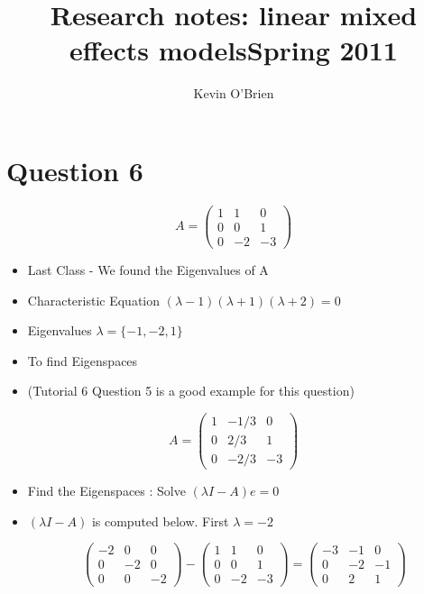 \documentclass[12pt, a4paper]{report}
\title{Research notes: linear mixed effects models}
\author{ } \date{ }
\theoremstyle{plain}
\theoremstyle{definition}
\theoremstyle{remark}
\begin{document}
\author{Kevin O'Brien}
\title{Spring 2011}

\newpage
\section*{Question 6}
{\Large
\[ A = \left(
\begin{array}{ccc}
1 & 1 & 0 \\
0 & 0 & 1 \\
0 & -2 & -3
\end{array} \right) \]
\begin{itemize}
\item Last Class - We found the Eigenvalues of A
\item Characteristic Equation $(\lambda - 1)(\lambda + 1)(\lambda + 2)=0$
\item Eigenvalues $\lambda = \{-1,-2,1\}$
\item To find Eigenspaces
\item (Tutorial 6 Question 5 is a good example for this question)
\end{itemize}


\[ A = \left(
\begin{array}{ccc}
1 & -1/3 & 0 \\
0 & 2/3 & 1 \\
0 & -2/3 & -3
\end{array} \right) \]

\newpage
\begin{itemize}
\item Find the Eigenspaces :
 Solve $(\lambda I -A)e=0$
\item $(\lambda I -A)$ is computed below. First $\lambda =-2$

\[
\left(
\begin{array}{ccc}
-2 & 0  & 0  \\
 0 & -2  & 0  \\
 0 &  0 & -2
\end{array}
\right) -
\left(
\begin{array}{ccc}
1 & 1  & 0  \\
 0 & 0  & 1  \\
 0 &  -2 & -3
\end{array}
\right) = \left(\begin{array}{ccc}
-3 & -1 & 0 \\
0 & -2 & -1 \\
0 & 2 & 1
\end{array} \right)\]
\end{itemize}

}
\end{document}
